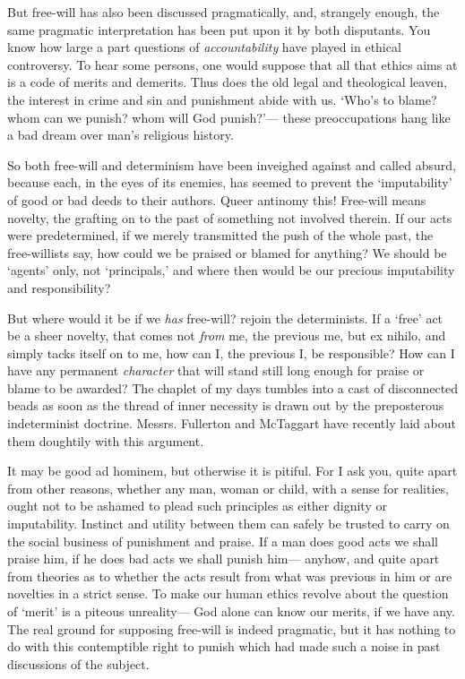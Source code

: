 \documentclass[]{article}
\begin{document}
But free-will has also been discussed pragmatically, and, strangely enough, the same pragmatic interpretation has been put upon it by both disputants. You know how large a part questions of \emph{accountability} have played in ethical controversy. To hear some persons, one would suppose that all that ethics aims at is a code of merits and demerits. Thus does the old legal and theological leaven, the interest in crime and sin and punishment abide with us. `Who's to blame? whom can we punish? whom will God punish?'--- these preoccupations hang like a bad dream over man's religious history.

So both free-will and determinism have been inveighed against and called absurd, because each, in the eyes of its enemies, has seemed to prevent the `imputability' of good or bad deeds to their authors. Queer antinomy this! Free-will means novelty, the grafting on to the past of something not involved therein. If our acts were predetermined, if we merely transmitted the push of the whole past, the free-willists say, how could we be praised or blamed for anything? We should be `agents' only, not `principals,' and where then would be our precious imputability and responsibility?

But where would it be if we \emph{has} free-will? rejoin the determinists. If a `free' act be a sheer novelty, that comes not \emph{from} me, the previous me, but ex nihilo, and simply tacks itself on to me, how can I, the previous I, be responsible? How can I have any permanent \emph{character} that will stand still long enough for praise or blame to be awarded? The chaplet of my days tumbles into a cast of disconnected beads as soon as the thread of inner necessity is drawn out by the preposterous indeterminist doctrine. Messrs. Fullerton and McTaggart have recently laid about them doughtily with this argument.

It may be good ad hominem, but otherwise it is pitiful. For I ask you, quite apart from other reasons, whether any man, woman or child, with a sense for realities, ought not to be ashamed to plead such principles as either dignity or imputability. Instinct and utility between them can safely be trusted to carry on the social business of punishment and praise. If a man does good acts we shall praise him, if he does bad acts we shall punish him--- anyhow, and quite apart from theories as to whether the acts result from what was previous in him or are novelties in a strict sense. To make our human ethics revolve about the question of `merit' is a piteous unreality--- God alone can know our merits, if we have any. The real ground for supposing free-will is indeed pragmatic, but it has nothing to do with this contemptible right to punish which had made such a noise in past discussions of the subject.
\end{document}
